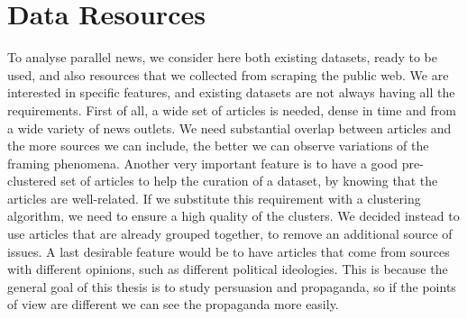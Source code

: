 \section{\statusgreen Data Resources}
\label{sec:cgs_data}
To analyse parallel news, we consider here both existing datasets, ready to be used, and also resources that we collected from scraping the public web.
We are interested in specific features, and existing datasets are not always having all the requirements.
First of all, a wide set of articles is needed, dense in time and from a wide variety of news outlets. We need substantial overlap between articles and the more sources we can include, the better we can observe variations of the framing phenomena.
Another very important feature is to have a good pre-clustered set of articles to help the curation of a dataset, %
by knowing that the articles are well-related.
If we substitute this requirement with a clustering algorithm, we need to ensure a high quality of the clusters. We decided instead to use articles that are already grouped together, to remove an additional source of issues.
A last desirable feature would be to have articles that come from sources with different opinions, such as different political ideologies. %
This is because the general goal of this thesis is to study persuasion and propaganda, so if the points of view are different we can see the propaganda more easily.

